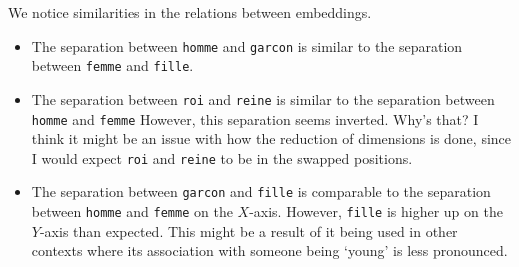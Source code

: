 \begin{problem}
  \newpage
  \begin{answer}
    We notice similarities in the relations between embeddings.
    \begin{itemize}
      \item The separation between \verb|homme| and \verb|garcon| is similar
        to the separation between \verb|femme| and \verb|fille|.
      \item The separation between \verb|roi| and \verb|reine| is similar
        to the separation between \verb|homme| and \verb|femme|
        However, this separation seems inverted. Why's that?
        I think it might be an issue with how the reduction of dimensions
        is done, since I would expect \verb|roi| and \verb|reine|
        to be in the swapped positions.
      \item The separation between \verb|garcon| and \verb|fille|
        is comparable to the separation between \verb|homme| and \verb|femme|
        on the $X$-axis. However, \verb|fille| is higher up on the $Y$-axis
        than expected. This might be a result of it being used in other contexts
        where its association with someone being `young' is less pronounced.
    \end{itemize}
  \end{answer}
\end{problem}
